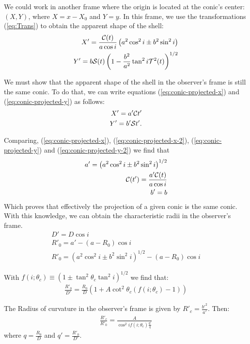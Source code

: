 We could work in another frame where the origin is located at the conic's center: $(X,Y)$, where $X=x-X_0$ and $Y=y$.
In this frame,  we use the transformations (\ref{eq:Trans})  to obtain the apparent shape of the shell:
\begin{align}
X' = \frac{\mathcal{C}(t)}{a\cos i}\left(a^2\cos^2 i \pm b^2\sin^2 i\right)  \label{eq:conic-projected-x}\\
Y'= b\mathcal{S}(t)\left(1-\frac{b^2}{a^2}\tan^2 i\mathcal{T}^2(t)\right)^{1/2}
\label{eq:conic-projected-y}
\end{align}


We must show that the apparent shape of the shell in the observer's frame is still the same conic. To do that, we can write equations
(\ref{eq:conic-projected-x}) and (\ref{eq:conic-projected-y}) as follows:
\begin{align}
X' = a'\mathcal{C} t' \label{eq:conic-projected-x-2} \\
Y' = b'\mathcal{S} t' \label{eq:conic-projected-y-2} . 
\end{align}

Comparing, (\ref{eq:conic-projected-x}), (\ref{eq:conic-projected-x-2}), (\ref{eq:conic-projected-y}) and (\ref{eq:conic-projected-y-2}) we find that
\begin{align}
a' = \left(a^2\cos^2 i \pm b^2\sin^2 i\right)^{1/2} \\
\mathcal{C}(t') = \frac{a'\mathcal{C}(t)}{a\cos i} \\
b' = b
\end{align} 
Which proves that effectively the projection of a given conic is the same conic. With this knowledge, we can obtain the characteristic radii in
the observer's frame.
\begin{align}
D' = D\cos i \\
R'_0 = a' - (a-R_0)\cos i \\
R'_0 = \left(a^2\cos^2 i \pm b^2\sin^2 i\right)^{1/2}  - (a-R_0)\cos i
\end{align}

With  $f(i;\theta_c)\equiv\left(1\pm\tan^2\theta_c\tan^2i\right)^{1/2}$ we find that:
\begin{align}
\frac{R'_0}{D'}=\frac{R_0}{D}\left(1+A\cot^2\theta_c(f(i;\theta_c)-1) \right)
\end{align}

The Radius of curvature in the observer's frame is given by $R'_c=\frac{b'^2}{a'}$. Then:
\begin{align}
\frac{R'_c}{R'_0} = \frac{A}{\cos^2 i f(i;\theta_c)\frac{q'}{q}}
\end{align}
where $q=\frac{R_0}{D}$ and $q' = \frac{R'_0}{D'}$. 


